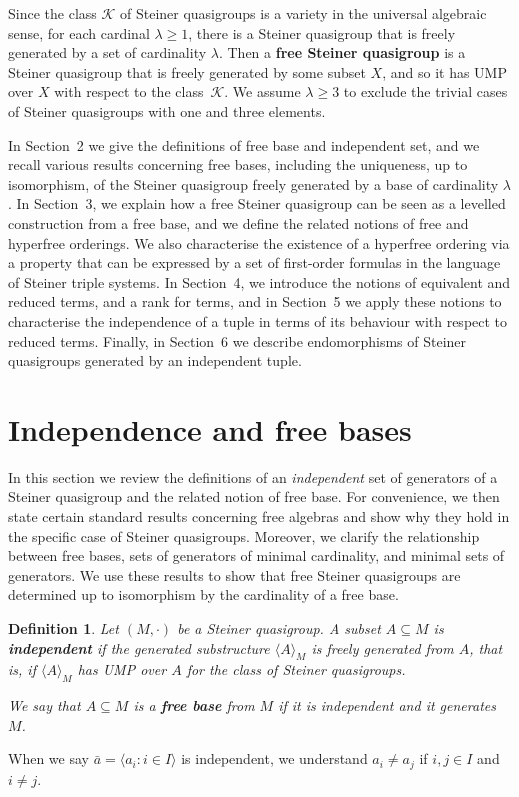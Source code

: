 \documentclass[a4paper, 11pt]{article}
\theoremstyle{note}
\newtheorem{df}[thm]{Definition}
\begin{document}
Since the class $\mathcal{K}$ of Steiner quasigroups is a variety in the universal algebraic sense, for each cardinal $\lambda \geq 1$, there is a Steiner quasigroup that is freely generated by a set of cardinality $\lambda$. Then a \textbf{free Steiner quasigroup} is a Steiner quasigroup that is freely generated by some subset $X$, and so it has UMP over $X$ with respect to the class~$\mathcal{K}$. We assume $\lambda \geq 3$ to exclude the trivial cases of Steiner quasigroups with one and three elements.

In Section~2 we give the definitions of free base and independent set, and we recall various results concerning free bases, including the uniqueness, up to isomorphism, of the Steiner quasigroup freely generated by a base of cardinality $\lambda$. In Section~3, we explain how a free Steiner quasigroup can be seen as a levelled construction from a free base, and we define the related notions of free and hyperfree orderings. We also characterise the existence of a hyperfree ordering via a property that can be expressed by a set of first-order formulas in the language of Steiner triple systems. In Section~4, we introduce the notions of equivalent and reduced terms, and a rank for terms, and in Section~5 we apply these notions to characterise the independence of a tuple in terms of its behaviour with respect to reduced terms. Finally, in Section~6 we describe endomorphisms of  Steiner quasigroups generated by an independent tuple.


\section{Independence and free bases}

In this section we review the definitions of an \textit{independent} set of generators of a Steiner quasigroup and the related notion of free base. For convenience, we then state certain standard results concerning free algebras and show why they hold in the specific case of Steiner quasigroups. Moreover, we clarify the relationship between free bases, sets of generators of minimal cardinality, and minimal sets of generators. We use these results to show that free Steiner quasigroups are determined up to isomorphism by the cardinality of a free base.
	
	\begin{df} Let $(M,\cdot)$ be a Steiner quasigroup. A subset $A\subseteq M$ is  \textbf{independent} if the generated substructure $\langle A\rangle_M$ is freely generated from $A$, that is, if $\langle A\rangle_M$ has UMP over $A$ for the class of Steiner quasigroups. 
		
		We say that $A\subseteq M$ is a \textbf{free base} from $M$  if it is independent and it generates $M$. 
	\end{df}
	When we say $\bar{a} = \langle a_i : i \in I \rangle$ is independent, we understand $a_i\neq a_j$ if  $i,j\in I$ and $i\neq j$.
	
\end{document}
